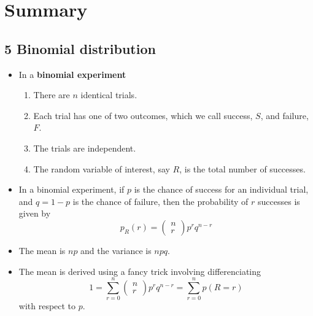 
\ifind
\section*{Summary}
\else
\subsection*{5 Binomial distribution}
\fi


\begin{itemize}
\item In a \textbf{binomial experiment}  
\begin{enumerate}
\item There are $n$ identical trials.
\item Each trial has one of two outcomes, which we call success, $S$,
  and failure, $F$.
\item The trials are independent.
\item The random variable of interest, say $R$, is the total number of successes.
\end{enumerate}
\item In a binomial experiment, if $p$ is the chance of success for an individual trial, and $q=1-p$ is the chance of failure, then the probability of $r$ successes is given by
\begin{equation}
p_R(r)=\left(\begin{array}{c}n\\r\end{array}\right)p^rq^{n-r}
\end{equation}
\item The mean is $np$ and the variance is $npq$.
\item The mean is derived using a fancy trick involving differenciating
  \begin{equation}
  1=\sum_{r=0}^n \left(\begin{array}{c}n\\r\end{array}\right)p^rq^{n-r}=\sum_{r=0}^np(R=r)
  \end{equation}
  with respect to $p$.
\end{itemize}
